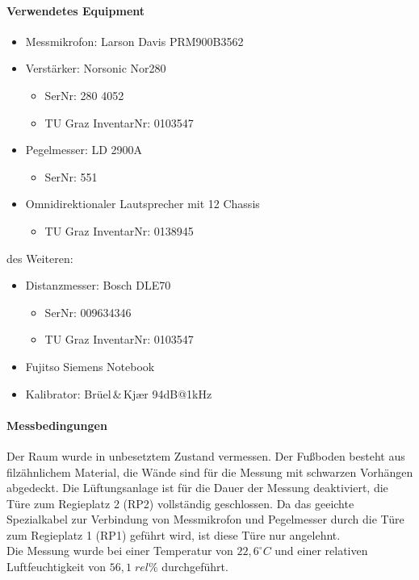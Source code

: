 \documentclass[11pt]{report}
\begin{document}
\paragraph{Verwendetes Equipment}
\begin{itemize}
\item Messmikrofon: Larson Davis PRM900B3562
\item Verst\"arker: Norsonic Nor280
\begin{itemize}
\item SerNr: 280 4052
\item TU Graz InventarNr: 0103547
\end{itemize}
\item Pegelmesser: LD 2900A
\begin{itemize}
\item SerNr: 551
\end{itemize}
\item Omnidirektionaler Lautsprecher mit 12 Chassis
\begin{itemize}
\item TU Graz InventarNr: 0138945
\end{itemize}
\end{itemize}
des Weiteren:
\begin{itemize}
\item Distanzmesser: Bosch DLE70
\begin{itemize}
\item SerNr: 009634346
\item TU Graz InventarNr: 0103547
\end{itemize}
\item Fujitso Siemens Notebook
\item Kalibrator: Br\"uel\,\&\,Kj\ae r 94dB@1kHz
\end{itemize}

\paragraph{Messbedingungen}
Der Raum wurde in unbesetztem Zustand vermessen. Der Fu\ss boden besteht aus filz\"ahnlichem Material, die W\"ande sind f\"ur die Messung mit schwarzen Vorh\"angen abgedeckt. Die L\"uftungsanlage ist f\"ur die Dauer der Messung deaktiviert, die T\"ure zum Regieplatz 2 (RP2) vollst\"andig geschlossen. Da das geeichte Spezialkabel zur Verbindung von Messmikrofon und Pegelmesser durch die T\"ure zum Regieplatz 1 (RP1) gef\"uhrt wird, ist diese T\"ure nur angelehnt.\\
Die Messung wurde bei einer Temperatur von $22,6^\circ C $ und einer relativen Luftfeuchtigkeit von $56,1\;rel\%$ durchgef\"uhrt.
\end{document}
